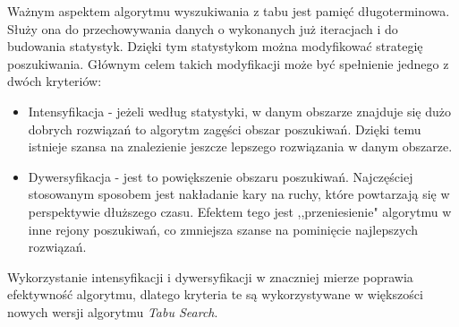 Ważnym aspektem algorytmu wyszukiwania z tabu jest pamięć długoterminowa. Służy ona do przechowywania danych o wykonanych już iteracjach i do budowania statystyk. Dzięki tym statystykom można modyfikować strategię poszukiwania. Głównym celem takich modyfikacji może być spełnienie jednego z dwóch kryteriów:
\begin{itemize}
	\item Intensyfikacja - jeżeli według statystyki, w danym obszarze znajduje się dużo dobrych rozwiązań to algorytm zagęści obszar poszukiwań. Dzięki temu istnieje szansa na znalezienie jeszcze lepszego rozwiązania w danym obszarze.
	\item Dywersyfikacja - jest to powiększenie obszaru poszukiwań. Najczęściej stosowanym sposobem jest nakładanie kary na ruchy, które powtarzają się w perspektywie dłuższego czasu. Efektem tego jest ,,przeniesienie" algorytmu w inne rejony poszukiwań, co zmniejsza szanse na pominięcie najlepszych rozwiązań.
\end{itemize}
Wykorzystanie intensyfikacji i dywersyfikacji w znaczniej mierze poprawia efektywność algorytmu, dlatego kryteria te są wykorzystywane w większości nowych wersji algorytmu \textit{Tabu Search}.




